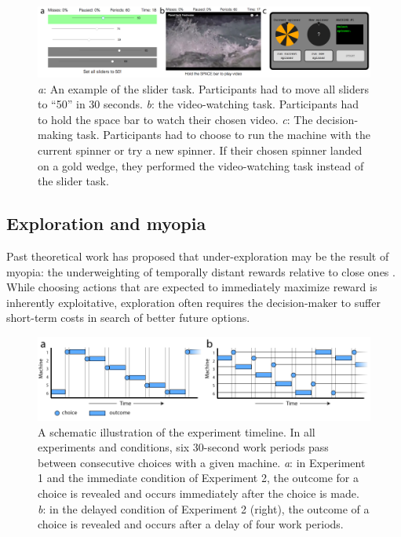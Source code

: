 \documentclass[10pt,letterpaper]{article}
\begin{document}
\begin{figure}
\centering
\includegraphics[width=\textwidth]{figures/taskpictures.png}
\caption{\emph{a}: An example of the slider task. Participants had to move all
  sliders to ``50'' in 30 seconds. \emph{b}: the video-watching task.
  Participants had to hold the space bar to watch their chosen video. \emph{c}:
  The decision-making task. Participants had to choose to run the machine with
  the current spinner or try a new spinner. If their chosen spinner landed on
  a gold wedge, they performed the video-watching task instead of the
  slider task.}
\label{fig:taskpictures}
\end{figure}

\subsection{Exploration and myopia}

Past theoretical work has proposed that under-exploration may be the result of myopia: the
underweighting of temporally distant rewards relative to close ones \citep{March1991, Levinthal1993}. 
While
choosing actions that are expected to immediately maximize reward is inherently
exploitative, exploration often requires the decision-maker to suffer short-term
costs in search of better future options.

\begin{figure}
\centering
\includegraphics[width=\textwidth]{figures/machinetimeline.png}
\caption{A schematic illustration of the experiment timeline. In all experiments
  and conditions, six 30-second work periods pass between consecutive choices
  with a given machine. \emph{a}: in Experiment 1 and the immediate condition of
  Experiment 2, the outcome for a choice is revealed and occurs immediately
  after the choice is made. \emph{b}: in the delayed condition of Experiment 2 (right),
  the outcome of a choice is revealed and occurs after a delay of four work
  periods.}
\label{fig:machinetimeline}
\end{figure}
\end{document}
